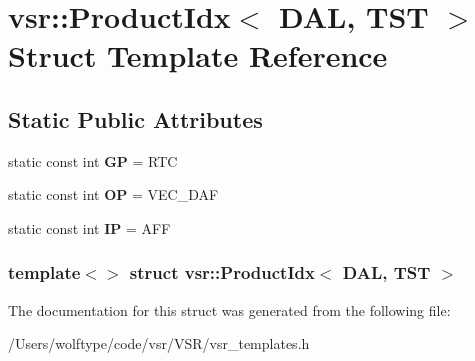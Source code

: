 \hypertarget{structvsr_1_1_product_idx_3_01_d_a_l_00_01_t_s_t_01_4}{\section{vsr\-:\-:Product\-Idx$<$ D\-A\-L, T\-S\-T $>$ Struct Template Reference}
\label{structvsr_1_1_product_idx_3_01_d_a_l_00_01_t_s_t_01_4}
}
\subsection*{Static Public Attributes}
\begin{DoxyCompactItemize}
\item 
\hypertarget{structvsr_1_1_product_idx_3_01_d_a_l_00_01_t_s_t_01_4_a297b13b31aa0a9a4de3d0a3d8c6b2ba6}{static const int {\bfseries G\-P} = R\-T\-C}\label{structvsr_1_1_product_idx_3_01_d_a_l_00_01_t_s_t_01_4_a297b13b31aa0a9a4de3d0a3d8c6b2ba6}

\item 
\hypertarget{structvsr_1_1_product_idx_3_01_d_a_l_00_01_t_s_t_01_4_a72aa305ebecda81de380252b76fb402a}{static const int {\bfseries O\-P} = V\-E\-C\-\_\-\-D\-A\-F}\label{structvsr_1_1_product_idx_3_01_d_a_l_00_01_t_s_t_01_4_a72aa305ebecda81de380252b76fb402a}

\item 
\hypertarget{structvsr_1_1_product_idx_3_01_d_a_l_00_01_t_s_t_01_4_a2345faf72446bfae85e6ffa408920c50}{static const int {\bfseries I\-P} = A\-F\-F}\label{structvsr_1_1_product_idx_3_01_d_a_l_00_01_t_s_t_01_4_a2345faf72446bfae85e6ffa408920c50}

\end{DoxyCompactItemize}
\subsubsection*{template$<$$>$ struct vsr\-::\-Product\-Idx$<$ D\-A\-L, T\-S\-T $>$}



The documentation for this struct was generated from the following file\-:\begin{DoxyCompactItemize}
\item 
/\-Users/wolftype/code/vsr/\-V\-S\-R/vsr\-\_\-templates.\-h\end{DoxyCompactItemize}
